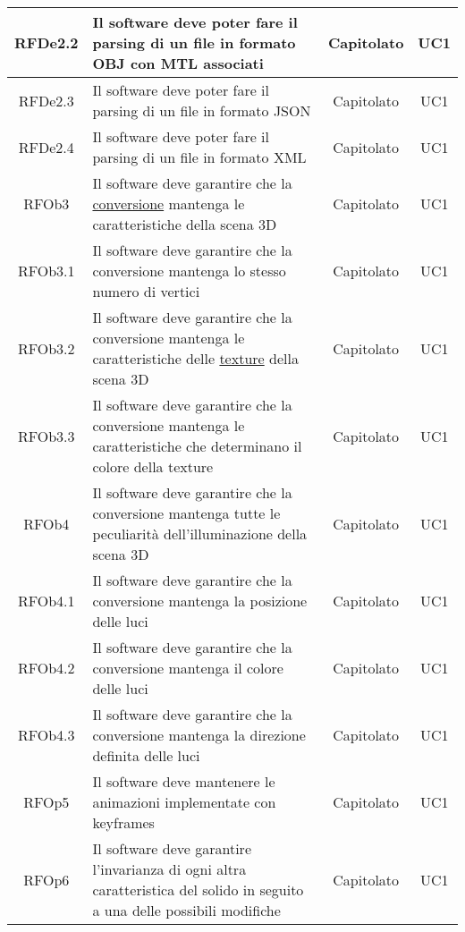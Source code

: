 \begin{longtable}{|c|p{6cm}|c|c|}
\midrule
RFDe2.2
& Il software deve poter fare il parsing di un file in formato OBJ con MTL associati
& Capitolato
& UC1
\\


\midrule
RFDe2.3
& Il software deve poter fare il parsing di un file in formato JSON
& Capitolato
& UC1
\\


\midrule
RFDe2.4
& Il software deve poter fare il parsing di un file in formato XML
& Capitolato
& UC1
\\


\midrule
RFOb3
& Il software deve garantire che la \underline{conversione} mantenga le caratteristiche della scena 3D
& Capitolato
& UC1
\\


\midrule
RFOb3.1
& Il software deve garantire che la conversione mantenga lo stesso numero di vertici
& Capitolato
& UC1
\\


\midrule
RFOb3.2
& Il software deve garantire che la conversione mantenga le caratteristiche delle \underline{texture} della scena 3D
& Capitolato
& UC1
\\


\midrule
RFOb3.3
& Il software deve garantire che la conversione mantenga le caratteristiche che determinano il colore della texture
& Capitolato
& UC1
\\


\midrule
RFOb4
& Il software deve garantire che la conversione mantenga tutte le peculiarità dell'illuminazione della scena 3D
& Capitolato
& UC1
\\


\midrule
RFOb4.1
& Il software deve garantire che la conversione mantenga la posizione delle luci
& Capitolato
& UC1
\\


\midrule
RFOb4.2
& Il software deve garantire che la conversione mantenga il colore delle luci
& Capitolato
& UC1
\\


\midrule
RFOb4.3
& Il software deve garantire che la conversione mantenga la direzione definita delle luci
& Capitolato
& UC1
\\


\midrule
RFOp5
& Il software deve mantenere le animazioni implementate con keyframes
& Capitolato
& UC1
\\


\midrule
RFOp6
& Il software deve garantire l'invarianza di ogni altra caratteristica del solido in seguito a una delle possibili modifiche
& Capitolato
& UC1
\\



\end{longtable}
